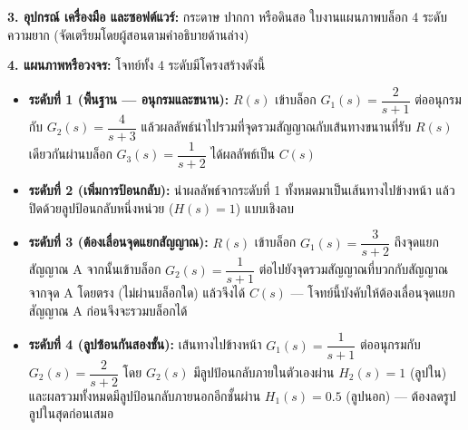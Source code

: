 \textbf{3. อุปกรณ์ เครื่องมือ และซอฟต์แวร์:} กระดาษ ปากกา หรือดินสอ ใบงานแผนภาพบล็อก 4 ระดับความยาก (จัดเตรียมโดยผู้สอนตามคำอธิบายด้านล่าง)

\textbf{4. แผนภาพหรือวงจร:} โจทย์ทั้ง 4 ระดับมีโครงสร้างดังนี้

\begin{itemize}
    \item \textbf{ระดับที่ 1 (พื้นฐาน — อนุกรมและขนาน):} $R(s)$ เข้าบล็อก $G_1(s)=\dfrac{2}{s+1}$ ต่ออนุกรมกับ $G_2(s)=\dfrac{4}{s+3}$ แล้วผลลัพธ์นำไปรวมที่จุดรวมสัญญาณกับเส้นทางขนานที่รับ $R(s)$ เดียวกันผ่านบล็อก $G_3(s)=\dfrac{1}{s+2}$ ได้ผลลัพธ์เป็น $C(s)$
    \item \textbf{ระดับที่ 2 (เพิ่มการป้อนกลับ):} นำผลลัพธ์จากระดับที่ 1 ทั้งหมดมาเป็นเส้นทางไปข้างหน้า แล้วปิดด้วยลูปป้อนกลับหนึ่งหน่วย ($H(s)=1$) แบบเชิงลบ
    \item \textbf{ระดับที่ 3 (ต้องเลื่อนจุดแยกสัญญาณ):} $R(s)$ เข้าบล็อก $G_1(s)=\dfrac{3}{s+2}$ ถึงจุดแยกสัญญาณ A จากนั้นเข้าบล็อก $G_2(s)=\dfrac{1}{s+1}$ ต่อไปยังจุดรวมสัญญาณที่บวกกับสัญญาณจากจุด A โดยตรง (ไม่ผ่านบล็อกใด) แล้วจึงได้ $C(s)$ — โจทย์นี้บังคับให้ต้องเลื่อนจุดแยกสัญญาณ A ก่อนจึงจะรวมบล็อกได้
    \item \textbf{ระดับที่ 4 (ลูปซ้อนกันสองชั้น):} เส้นทางไปข้างหน้า $G_1(s)=\dfrac{1}{s+1}$ ต่ออนุกรมกับ $G_2(s)=\dfrac{2}{s+2}$ โดย $G_2(s)$ มีลูปป้อนกลับภายในตัวเองผ่าน $H_2(s)=1$ (ลูปใน) และผลรวมทั้งหมดมีลูปป้อนกลับภายนอกอีกชั้นผ่าน $H_1(s)=0.5$ (ลูปนอก) — ต้องลดรูปลูปในสุดก่อนเสมอ
\end{itemize}


